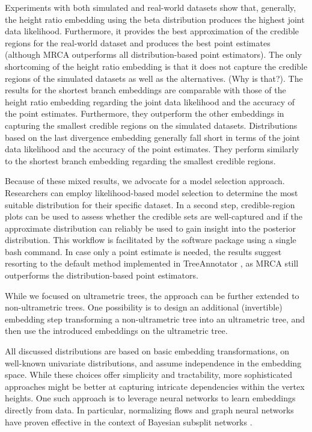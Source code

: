 \documentclass[10pt,letterpaper]{article}
\begin{document}
Experiments with both simulated and real-world datasets show that, generally, the height ratio embedding using the beta distribution produces the highest joint data likelihood. Furthermore, it provides the best approximation of the credible regions for the real-world dataset and produces the best point estimates (although MRCA outperforms all distribution-based point estimators). The only shortcoming of the height ratio embedding is that it does not capture the credible regions of the simulated datasets as well as the alternatives. (Why is that?). The results for the shortest branch embeddings are comparable with those of the height ratio embedding regarding the joint data likelihood and the accuracy of the point estimates. Furthermore, they outperform the other embeddings in capturing the smallest credible regions on the simulated datasets. Distributions based on the last divergence embedding generally fall short in terms of the joint data likelihood and the accuracy of the point estimates. They perform similarly to the shortest branch embedding regarding the smallest credible regions.

Because of these mixed results, we advocate for a model selection approach. Researchers can employ likelihood-based model selection to determine the most suitable distribution for their specific dataset. In a second step, credible-region plots can be used to assess whether the credible sets are well-captured and if the approximate distribution can reliably be used to gain insight into the posterior distribution. This workflow is facilitated by the software package using a single bash command. In case only a point estimate is needed, the results suggest resorting to the default method implemented in TreeAnnotator \cite{treeannotator}, as MRCA still outperforms the distribution-based point estimators.

While we focused on ultrametric trees, the approach can be further extended to non-ultrametric trees. One possibility is to design an additional (invertible) embedding step transforming a non-ultrametric tree into an ultrametric tree, and then use the introduced embeddings on the ultrametric tree.

All discussed distributions are based on basic embedding transformations, on well-known univariate distributions, and assume independence in the embedding space. While these choices offer simplicity and tractability, more sophisticated approaches might be better at capturing intricate dependencies within the vertex heights. One such approach is to leverage neural networks to learn embeddings directly from data. In particular, normalizing flows \cite{normalizingflow} and graph neural networks \cite{graphnn} have proven effective in the context of Bayesian subsplit networks \cite{subsplitnf,artree}.
\end{document}
